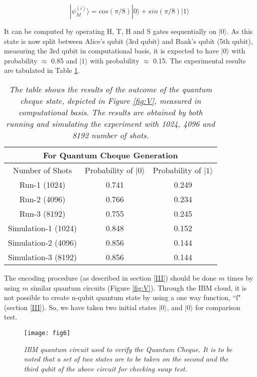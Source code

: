 \documentclass[aps,pra,twocolumn,groupedaddress,showpacs,showkeys]{revtex4-1}
\begin{document}
\begin{equation} |\psi_M^{(i)}\rangle = cos(\pi/8)|0\rangle + sin(\pi/8)|1\rangle \end{equation} 

It can be computed by operating H, T, H and S gates sequentially on $|0\rangle$. As this state is now split between Alice's qubit (3rd qubit) and Bank's qubit (5th qubit), measuring the 3rd qubit in computational basis, it is expected to have $|0\rangle$ with probability $\approx$ 0.85 and $|1\rangle$ with probability $\approx$ 0.15. The experimental results are tabulated in Table \ref{tab1}. 

\begin{table}[h]
\centering
\caption{\emph{The table shows the results of the outcome of the quantum cheque state, depicted in Figure \ref{fig:V}, measured in computational basis. The results are obtained by both running and simulating the experiment with 1024, 4096 and 8192 number of shots.}}
\begin{tabular}{|c|c|c|}
\hline
\multicolumn{3}{|c|}{For Quantum Cheque Generation}\\
 \hline
 Number of Shots
 & Probability of $|0\rangle$ & Probability of $|1\rangle$\\
 \hline
Run-1 (1024) & 0.741 & 0.249\\
Run-2 (4096) & 0.766 & 0.234\\
Run-3 (8192) & 0.755 & 0.245\\ \hline
Simulation-1 (1024) & 0.848 & 0.152\\
Simulation-2 (4096) & 0.856 & 0.144\\
Simulation-3 (8192) & 0.856 & 0.144\\
 \hline
\end{tabular}
\label{tab1}
\end{table}

The encoding procedure (as described in section \ref{III}) should be done $m$ times by using $m$ similar quantum circuits (Figure \ref{fig:V}). Through the IBM cloud, it is not possible to create n-qubit quantum state by using a one way function, ``f" (section \ref{III}). So, we have taken two initial states $|0\rangle$, and $|0\rangle$ for comparison test.  

\begin{figure}[h]
    \centering
    \texttt{[image: fig6]}
    \caption{\emph{IBM quantum circuit used to verify the Quantum Cheque. It is to be noted that a set of two states are to be taken on the second and the third qubit of the above circuit for checking swap test.}}
    \label{fig:VI}
\end{figure}
\end{document}
